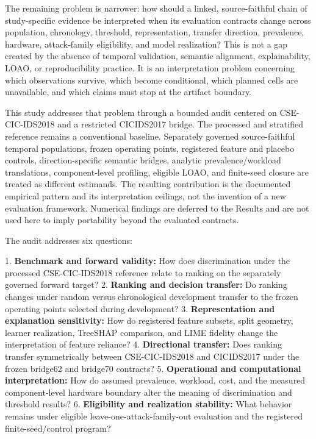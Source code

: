 \documentclass[preprint,12pt]{elsarticle}
\begin{document}
The remaining problem is narrower: how should a linked, source-faithful chain of study-specific evidence be interpreted when its evaluation contracts change across population, chronology, threshold, representation, transfer direction, prevalence, hardware, attack-family eligibility, and model realization? This is not a gap created by the absence of temporal validation, semantic alignment, explainability, LOAO, or reproducibility practice. It is an interpretation problem concerning which observations survive, which become conditional, which planned cells are unavailable, and which claims must stop at the artifact boundary.

This study addresses that problem through a bounded audit centered on CSE-CIC-IDS2018 and a restricted CICIDS2017 bridge. The processed and stratified reference remains a conventional baseline. Separately governed source-faithful temporal populations, frozen operating points, registered feature and placebo controls, direction-specific semantic bridges, analytic prevalence/workload translations, component-level profiling, eligible LOAO, and finite-seed closure are treated as different estimands. The resulting contribution is the documented empirical pattern and its interpretation ceilings, not the invention of a new evaluation framework. Numerical findings are deferred to the Results and are not used here to imply portability beyond the evaluated contracts.

The audit addresses six questions:

1. \textbf{Benchmark and forward validity:} How does discrimination under the processed CSE-CIC-IDS2018 reference relate to ranking on the separately governed forward target?
2. \textbf{Ranking and decision transfer:} Do ranking changes under random versus chronological development transfer to the frozen operating points selected during development?
3. \textbf{Representation and explanation sensitivity:} How do registered feature subsets, split geometry, learner realization, TreeSHAP comparison, and LIME fidelity change the interpretation of feature reliance?
4. \textbf{Directional transfer:} Does ranking transfer symmetrically between CSE-CIC-IDS2018 and CICIDS2017 under the frozen bridge62 and bridge70 contracts?
5. \textbf{Operational and computational interpretation:} How do assumed prevalence, workload, cost, and the measured component-level hardware boundary alter the meaning of discrimination and threshold results?
6. \textbf{Eligibility and realization stability:} What behavior remains under eligible leave-one-attack-family-out evaluation and the registered finite-seed/control program?
\end{document}
